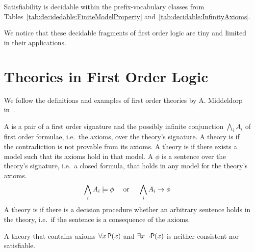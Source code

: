 \begin{lemma}[\cite{MR1482227}]
	Satisfiability is decidable within the prefix-vocabulary classes from
	Tables~\ref{tab:decidedable:FiniteModelProperty} and~\vref{tab:decidable:InfinityAxioms}.
\end{lemma}

\noindent We notice that these decidable fragments of first order logic are 
tiny and limited in their applications.



\section{Theories in First Order Logic}\label{sec:decidable:fol:theories}

We follow the definitions and examples of first order theories
by A. Middeldorp in~\cite{AM2015L}.

\begin{definition}[Theory]
	A  is a pair of a first order signature
	and the possibly infinite conjunction \( \bigwedge_i A_i \) of first order formulae,
	i.e.~the axioms, over the theory's signature.
	A theory is  if the contradiction is not provable from its axioms.
	A theory is  if there exists a model such that its axioms hold
	in that model.
%
	A  \( \phi \) is a sentence over the theory's signature,
	i.e.~a closed formula, that holds in any model for the theory's axioms.
	\[
		\bigwedge_i A_i \models \phi
		\quad\text{ or }\quad
		\bigwedge_i A_i \rightarrow \phi
	\]
	A theory is  if there is a decision procedure whether an arbitrary sentence holds in the theory, i.e.~if the sentence is a consequence of the axioms.
\end{definition}
%
\begin{example}
A theory that contains axioms \( \forall x\,\mathsf{P}(x) \) and \( \exists x\,\lnot\mathsf{P}(x) \) 
is neither consistent nor satisfiable. 
\end{example}

